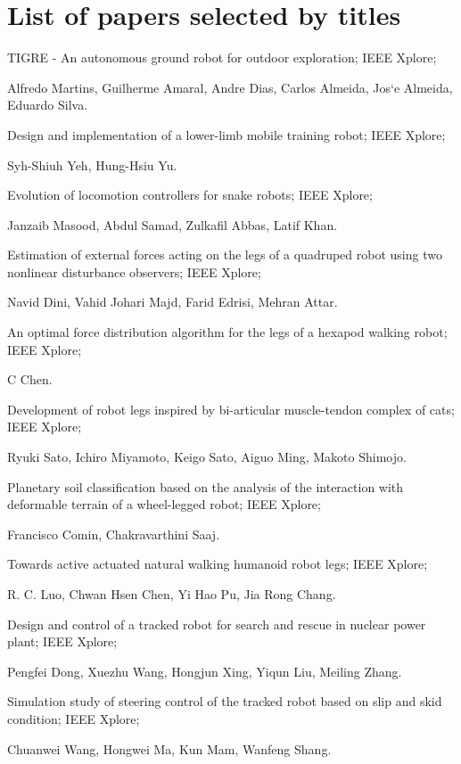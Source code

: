 \documentclass{romjist}
\begin{document}
\section{List of papers selected by titles}
TIGRE - An autonomous ground robot for outdoor exploration; IEEE Xplore; \par\noindent Alfredo Martins, Guilherme Amaral, Andre Dias, Carlos Almeida, Jos`e Almeida, Eduardo Silva.\par
Design and implementation of a lower-limb mobile training robot; IEEE Xplore;\par\noindent Syh-Shiuh Yeh, Hung-Hsiu Yu.\par
Evolution of locomotion controllers for snake robots; IEEE Xplore;\par\noindent Janzaib Masood, Abdul Samad, Zulkafil Abbas, Latif Khan.\par
Estimation of external forces acting on the legs of a quadruped robot using two nonlinear disturbance observers; IEEE Xplore;\par\noindent Navid Dini, Vahid Johari Majd, Farid Edrisi, Mehran Attar.\par
An optimal force distribution algorithm for the legs of a hexapod walking robot; IEEE Xplore; \par\noindent C Chen. \par
Development of robot legs inspired by bi-articular muscle-tendon complex of cats; IEEE Xplore; \par\noindent Ryuki Sato, Ichiro Miyamoto, Keigo Sato, Aiguo Ming, Makoto Shimojo.\par 
Planetary soil classification based on the analysis of the interaction with deformable terrain of a wheel-legged robot; IEEE Xplore;\par\noindent Francisco Comin, Chakravarthini Saaj.\par
Towards active actuated natural walking humanoid robot legs; IEEE Xplore;\par\noindent R. C. Luo, Chwan Hsen Chen, Yi Hao Pu, Jia Rong Chang.\par
Design and control of a tracked robot for search and rescue in nuclear power plant; IEEE Xplore;\par\noindent Pengfei Dong, Xuezhu Wang, Hongjun Xing, Yiqun Liu, Meiling Zhang.\par
Simulation study of steering control of the tracked robot based on slip and skid condition; IEEE Xplore;\par\noindent Chuanwei Wang, Hongwei Ma, Kun Mam, Wanfeng Shang.\par
\end{document}

